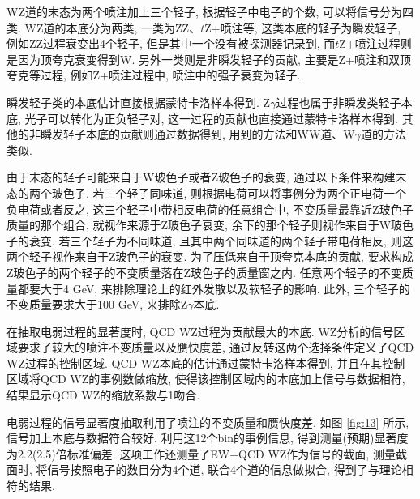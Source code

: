 \documentclass{SCIS2020cn}
\newcommand{\Wboson}{\text{W}}
\newcommand{\Zboson}{\text{Z}}
\begin{document}
WZ道的末态为两个喷注加上三个轻子, 根据轻子中电子的个数, 可以将信号分为四类. WZ道的本底分为两类, 一类为ZZ、$t$Z+喷注等, 这类本底的轻子为瞬发轻子, 例如ZZ过程衰变出4个轻子, 但是其中一个没有被探测器记录到, 而$t$Z+喷注过程则是因为顶夸克衰变得到W. 另外一类则是非瞬发轻子的贡献, 主要是Z+喷注和双顶夸克等过程, 例如Z+喷注过程中, 喷注中的强子衰变为轻子. 

瞬发轻子类的本底估计直接根据蒙特卡洛样本得到. $\Zboson\gamma$过程也属于非瞬发类轻子本底, 光子可以转化为正负轻子对, 这一过程的贡献也直接通过蒙特卡洛样本得到. 其他的非瞬发轻子本底的贡献则通过数据得到, 用到的方法和WW道、$\Wboson\gamma$道的方法类似. 

由于末态的轻子可能来自于W玻色子或者Z玻色子的衰变, 通过以下条件来构建末态的两个玻色子. 若三个轻子同味道, 则根据电荷可以将事例分为两个正电荷一个负电荷或者反之, 这三个轻子中带相反电荷的任意组合中, 不变质量最靠近Z玻色子质量的那个组合, 就视作来源于Z玻色子衰变, 余下的那个轻子则视作来自于W玻色子的衰变. 若三个轻子为不同味道, 且其中两个同味道的两个轻子带电荷相反, 则这两个轻子视作来自于Z玻色子的衰变. 为了压低来自于顶夸克本底的贡献, 要求构成Z玻色子的两个轻子的不变质量落在Z玻色子的质量窗之内. 任意两个轻子的不变质量都要大于4 GeV, 来排除理论上的红外发散以及软轻子的影响. 此外, 三个轻子的不变质量要求大于100 GeV, 来排除$\Zboson\gamma$本底. 

在抽取电弱过程的显著度时, QCD WZ过程为贡献最大的本底. WZ分析的信号区域要求了较大的喷注不变质量以及赝快度差, 通过反转这两个选择条件定义了QCD WZ过程的控制区域. QCD WZ本底的估计通过蒙特卡洛样本得到, 并且在其控制区域将QCD WZ的事例数做缩放, 使得该控制区域内的本底加上信号与数据相符, 结果显示QCD WZ的缩放系数与1吻合. 

电弱过程的信号显著度抽取利用了喷注的不变质量和赝快度差. 如图 \ref{fig:13} 所示, 信号加上本底与数据符合较好. 利用这12个bin的事例信息, 得到测量(预期)显著度为2.2(2.5)倍标准偏差. 这项工作还测量了EW+QCD WZ作为信号的截面, 测量截面时, 将信号按照电子的数目分为4个道, 联合4个道的信息做拟合, 得到了与理论相符的结果. 
\end{document}
